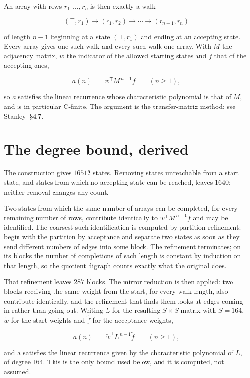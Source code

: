 \documentclass[11pt]{article}
\theoremstyle{definition}
\begin{document}
An array with rows $r_1,\dots,r_n$ is then exactly a walk

\[(\top,r_1) \to (r_1,r_2) \to \cdots \to (r_{n-1},r_n)\]

of length $n-1$ beginning at a state $(\top,r_1)$ and ending at an accepting state. Every array gives one such walk and every such walk one array. With $M$ the adjacency matrix, $w$ the indicator of the allowed starting states and $f$ that of the accepting ones,

\[a(n) \;=\; w^{\mathsf T} M^{\,n-1} f \qquad (n \ge 1),\]

so $a$ satisfies the linear recurrence whose characteristic polynomial is that of $M$, and is in particular C-finite. The argument is the transfer-matrix method; see Stanley~\S4.7.

\section{The degree bound, derived}

The construction gives $16512$ states. Removing states unreachable from a start state, and states from which no accepting state can be reached, leaves $1640$; neither removal changes any count.

Two states from which the same number of arrays can be completed, for every remaining number of rows, contribute identically to $w^{\mathsf T}M^{\,n-1}f$ and may be identified. The coarsest such identification is computed by partition refinement: begin with the partition by acceptance and separate two states as soon as they send different numbers of edges into some block. The refinement terminates; on its blocks the number of completions of each length is constant by induction on that length, so the quotient digraph counts exactly what the original does.

That refinement leaves $287$ blocks. The mirror reduction is then applied: two blocks receiving the same weight from the start, for every walk length, also contribute identically, and the refinement that finds them looks at edges coming in rather than going out. Writing $L$ for the resulting $S \times S$ matrix with $S = 164$, $\tilde w$ for the start weights and $\tilde f$ for the acceptance weights,

\[a(n) \;=\; \tilde w^{\mathsf T} L^{\,n-1} \tilde f \qquad (n \ge 1),\]

and $a$ satisfies the linear recurrence given by the characteristic polynomial of $L$, of degree $164$. This is the only bound used below, and it is computed, not assumed.
\end{document}
